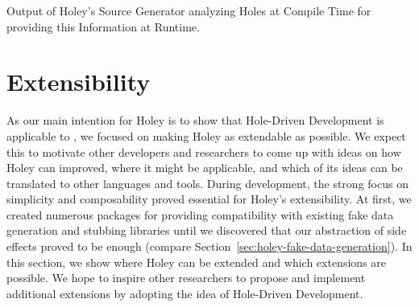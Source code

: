 \begin{program}[ht]
\caption{Output of Holey's Source Generator analyzing Holes at Compile Time for providing this Information at Runtime.}
\label{prg:holey-source-generators}
\end{program}

\section{Extensibility}
\label{sec:holey-extensibility}
As our main intention for Holey is to show that Hole-Driven Development is applicable to \CS, we focused on making Holey as extendable as possible.
We expect this to motivate other developers and researchers to come up with ideas on how Holey can improved, where it might be applicable, and which of its ideas can be translated to other languages and tools.
During development, the strong focus on simplicity and composability proved essential for Holey's extensibility.
At first, we created numerous packages for providing compatibility with existing fake data generation and stubbing libraries until we discovered that our abstraction of side effects proved to be enough (compare Section~\ref{sec:holey-fake-data-generation}).
In this section, we show where Holey can be extended and which extensions are possible.
We hope to inspire other researchers to propose and implement additional extensions by adopting the idea of Hole-Driven Development.

